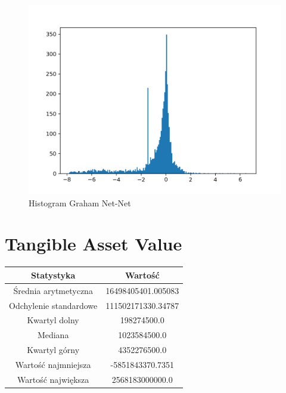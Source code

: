 \documentclass{article}
\begin{document}
\begin{figure}[h!]
    \includegraphics[width=\linewidth]{variables/Graham Net-Net.png}
    \caption{Histogram Graham Net-Net }
\end{figure}\section{ Tangible Asset Value }

\begin{center}
    \begin{tabular}{|c | c|} 
    \hline
    Statystyka & Wartość \\
    \hline\hline
    Średnia arytmetyczna & 16498405401.005083 \\ 
    \hline
    Odchylenie standardowe & 111502171330.34787 \\
    \hline
    Kwartyl dolny & 198274500.0 \\
    \hline
    Mediana & 1023584500.0 \\
    \hline
    Kwartyl górny & 4352276500.0 \\
    \hline
    Wartość najmniejsza & -5851843370.7351 \\
    \hline
    Wartość największa & 2568183000000.0 \\
    \hline
   \end{tabular}
\end{center}
\end{document}
